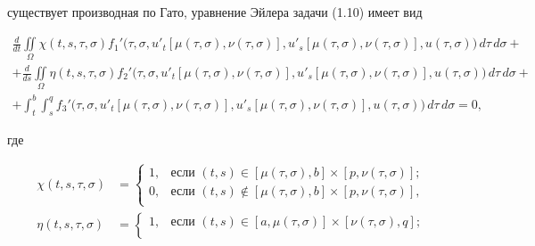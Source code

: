 \begin{exam}
существует производная по Гато, уравнение Эйлера задачи (1.10) имеет вид


\begin{multline*}


\frac{d}{dt}\iint\limits_{\Omega}\chi(t,s,\tau,\sigma)f_1'


\big(\tau,\sigma,u'_t[\mu(\tau,\sigma),\nu(\tau,\sigma)],u'_s[\mu(\tau,\sigma),


\nu(\tau,\sigma)],u(\tau,\sigma)\big)\,


d\tau\, d\sigma+\\


%


+\frac{d}{ds}\iint\limits_{\Omega}\eta(t,s,\tau,\sigma)f_2'


\big(\tau,\sigma,u'_t[\mu(\tau,\sigma),\nu(\tau,\sigma)],u'_s[\mu(\tau,\sigma),


\nu(\tau,\sigma)],u(\tau,\sigma)\big)\,


d\tau\, d\sigma+ \\


%


+\int_t^b\int_s^qf_3'


\big(\tau,\sigma,u'_t[\mu(\tau,\sigma),\nu(\tau,\sigma)],u'_s[\mu(\tau,\sigma),


\nu(\tau,\sigma)],u(\tau,\sigma)\big)\,


d\tau\, d\sigma=0,


\end{multline*}


где


\begin{align*}


\chi(t,s,\tau,\sigma)&=


\begin{cases}


1,&\text{если }(t,s)\in [\mu(\tau,\sigma),b]\times[p,\nu(\tau,\sigma)];\\


0,&\text{если }(t,s)\notin[\mu(\tau,\sigma),b]\times[p,\nu(\tau,\sigma)],\\


\end{cases}


\\


\eta(t,s,\tau,\sigma)&=


\begin{cases}


1,&\text{если }(t,s)\in [a,\mu(\tau,\sigma)]\times[\nu(\tau,\sigma),q];\\



\end{cases}
\end{align*}
\end{exam}
